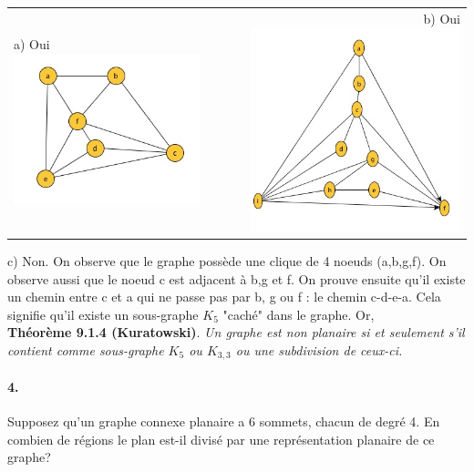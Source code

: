\begin{tabular}{lcr}
a) Oui
\includegraphics[scale=.4]{ape9_ex3_a_2.jpg}
& $\qquad$ & b) Oui \includegraphics[scale=.4]{ape9_ex3_b_2.jpg} \\
\end{tabular}


c) Non. On observe que le graphe possède une clique de 4 noeuds (a,b,g,f). On observe aussi que le noeud c est adjacent à b,g et f. On prouve ensuite qu'il existe un chemin entre c et a qui ne passe pas par b, g ou f : le chemin c-d-e-a. Cela signifie qu'il existe un sous-graphe $K_5$ "caché" dans le graphe. Or, \\

\textbf{Théorème 9.1.4 (Kuratowski)}.\textit{ Un graphe est non planaire si et seulement s’il contient comme sous-graphe $K_5$ ou $K_{3,3}$ ou une subdivision de ceux-ci.}


\paragraph{4. }Supposez qu'un graphe connexe planaire a 6 sommets, chacun de degré 4. En combien de régions le plan est-il divisé par une représentation planaire de ce graphe?\\

